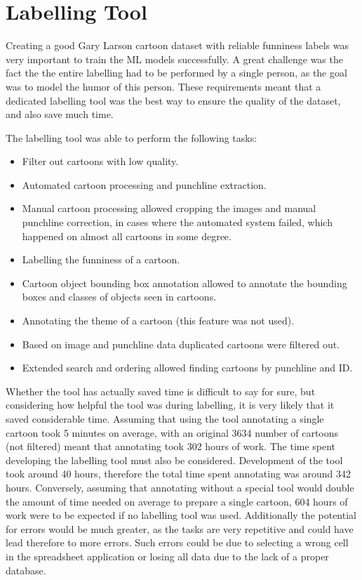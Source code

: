 \documentclass[draft,final,oneside]{vutinfth} %
\begin{document}
\fi

\section{Labelling Tool}

Creating a good Gary Larson cartoon dataset with reliable funniness labels was very important to train the ML models successfully. A great challenge was the fact the the entire labelling had to be performed by a single person, as the goal was to model the humor of this person. These requirements meant that a dedicated labelling tool was the best way to ensure the quality of the dataset, and also save much time.

The labelling tool was able to perform the following tasks:
\begin{itemize}
\item Filter out cartoons with low quality.
\item Automated cartoon processing and punchline extraction.
\item Manual cartoon processing allowed cropping the images and manual punchline correction, in cases where the automated system failed, which happened on almost all cartoons in some degree.
\item  Labelling the funniness of a cartoon.
\item Cartoon object bounding box annotation allowed to annotate the bounding boxes and classes of objects seen in cartoons.
\item Annotating the theme of a cartoon (this feature was not used).
\item Based on image and punchline data duplicated cartoons were filtered out.
\item Extended search and ordering allowed finding cartoons by punchline and ID.
\end{itemize}

Whether the tool has actually saved time is difficult to say for sure, but considering how helpful the tool was during labelling, it is very likely that it saved considerable time. Assuming that using the tool annotating a single cartoon took 5 minutes on average, with an original 3634 number of cartoons (not filtered) meant that annotating took 302 hours of work. The time spent developing the labelling tool must also be considered. Development of the tool took around 40 hours, therefore the total time spent annotating was around 342 hours. Conversely, assuming that annotating without a special tool would double the amount of time needed on average to prepare a single cartoon, 604 hours of work were to be expected if no labelling tool was used. Additionally the potential for errors would be much greater, as the tasks are very repetitive and could have lead therefore to more errors. Such errors could be due to selecting a wrong cell in the spreadsheet application or losing all data due to the lack of a proper database.
\end{document}
